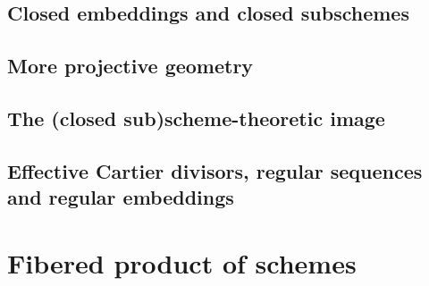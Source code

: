 \documentclass[11pt]{book} %
\begin{document}
\section{Closed embeddings and closed subschemes}
\section{More projective geometry}
\section{The (closed sub)scheme-theoretic image}
\section{Effective Cartier divisors, regular sequences and regular embeddings}
\chapter{Fibered product of schemes}
\end{document}
